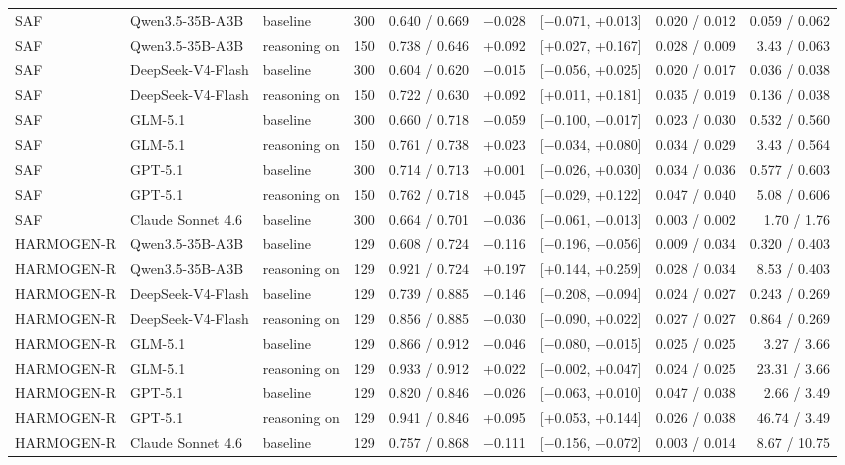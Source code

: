 \documentclass[10pt]{article}
\begin{document}
\begin{longtable}{lllrrrlrr}
SAF & Qwen3.5-35B-A3B & baseline & 300 & 0.640 / 0.669 & $-$0.028 & [$-$0.071, +0.013] & 0.020 / 0.012 & 0.059 / 0.062 \\
SAF & Qwen3.5-35B-A3B & reasoning on & 150 & 0.738 / 0.646 & +0.092 & [+0.027, +0.167] & 0.028 / 0.009 & 3.43 / 0.063 \\
SAF & DeepSeek-V4-Flash & baseline & 300 & 0.604 / 0.620 & $-$0.015 & [$-$0.056, +0.025] & 0.020 / 0.017 & 0.036 / 0.038 \\
SAF & DeepSeek-V4-Flash & reasoning on & 150 & 0.722 / 0.630 & +0.092 & [+0.011, +0.181] & 0.035 / 0.019 & 0.136 / 0.038 \\
SAF & GLM-5.1 & baseline & 300 & 0.660 / 0.718 & $-$0.059 & [$-$0.100, $-$0.017] & 0.023 / 0.030 & 0.532 / 0.560 \\
SAF & GLM-5.1 & reasoning on & 150 & 0.761 / 0.738 & +0.023 & [$-$0.034, +0.080] & 0.034 / 0.029 & 3.43 / 0.564 \\
SAF & GPT-5.1 & baseline & 300 & 0.714 / 0.713 & +0.001 & [$-$0.026, +0.030] & 0.034 / 0.036 & 0.577 / 0.603 \\
SAF & GPT-5.1 & reasoning on & 150 & 0.762 / 0.718 & +0.045 & [$-$0.029, +0.122] & 0.047 / 0.040 & 5.08 / 0.606 \\
SAF & Claude Sonnet 4.6 & baseline & 300 & 0.664 / 0.701 & $-$0.036 & [$-$0.061, $-$0.013] & 0.003 / 0.002 & 1.70 / 1.76 \\
HARMOGEN-R & Qwen3.5-35B-A3B & baseline & 129 & 0.608 / 0.724 & $-$0.116 & [$-$0.196, $-$0.056] & 0.009 / 0.034 & 0.320 / 0.403 \\
HARMOGEN-R & Qwen3.5-35B-A3B & reasoning on & 129 & 0.921 / 0.724 & +0.197 & [+0.144, +0.259] & 0.028 / 0.034 & 8.53 / 0.403 \\
HARMOGEN-R & DeepSeek-V4-Flash & baseline & 129 & 0.739 / 0.885 & $-$0.146 & [$-$0.208, $-$0.094] & 0.024 / 0.027 & 0.243 / 0.269 \\
HARMOGEN-R & DeepSeek-V4-Flash & reasoning on & 129 & 0.856 / 0.885 & $-$0.030 & [$-$0.090, +0.022] & 0.027 / 0.027 & 0.864 / 0.269 \\
HARMOGEN-R & GLM-5.1 & baseline & 129 & 0.866 / 0.912 & $-$0.046 & [$-$0.080, $-$0.015] & 0.025 / 0.025 & 3.27 / 3.66 \\
HARMOGEN-R & GLM-5.1 & reasoning on & 129 & 0.933 / 0.912 & +0.022 & [$-$0.002, +0.047] & 0.024 / 0.025 & 23.31 / 3.66 \\
HARMOGEN-R & GPT-5.1 & baseline & 129 & 0.820 / 0.846 & $-$0.026 & [$-$0.063, +0.010] & 0.047 / 0.038 & 2.66 / 3.49 \\
HARMOGEN-R & GPT-5.1 & reasoning on & 129 & 0.941 / 0.846 & +0.095 & [+0.053, +0.144] & 0.026 / 0.038 & 46.74 / 3.49 \\
HARMOGEN-R & Claude Sonnet 4.6 & baseline & 129 & 0.757 / 0.868 & $-$0.111 & [$-$0.156, $-$0.072] & 0.003 / 0.014 & 8.67 / 10.75 \\
\hline
\end{longtable}
\endgroup
\end{document}
